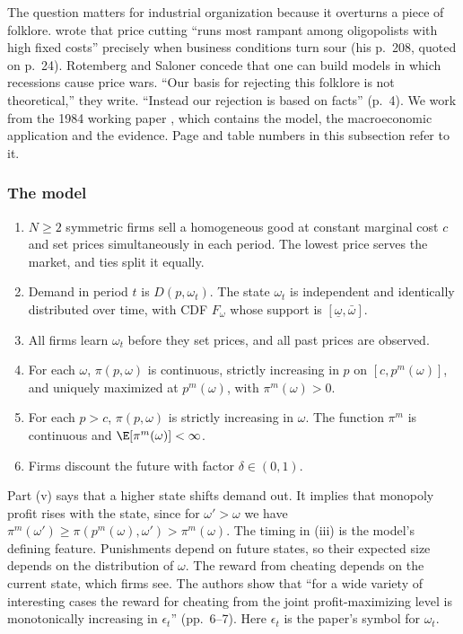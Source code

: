 The question matters for industrial organization because it overturns a piece of folklore. \citet{Scherer1980}
wrote that price cutting ``runs most rampant among oligopolists with high fixed costs'' precisely when business
conditions turn sour (his p.~208, quoted on p.~24). Rotemberg and Saloner concede that one can build models in which recessions
cause price wars. ``Our basis for rejecting this folklore is not theoretical,'' they write. ``Instead our rejection is
based on facts'' (p.~4). We work from the 1984 working paper \citep{RotembergSaloner1984}, which contains the model,
the macroeconomic application and the evidence. Page and table numbers in this subsection refer to it.

\subsubsection{The model}

\begin{assumption}\label{asm:12-rs}
\leavevmode
\begin{enumerate}[label=(\roman*)]
\item $N \ge 2$ symmetric firms sell a homogeneous good at constant marginal cost $c$ and set prices simultaneously in
each period. The lowest price serves the market, and ties split it equally.
\item Demand in period $t$ is $D(p, \omega_t)$. The state $\omega_t$ is independent and identically distributed over
time, with CDF $F_\omega$ whose support is $[\underline\omega, \bar\omega]$.
\item All firms learn $\omega_t$ before they set prices, and all past prices are observed.
\item For each $\omega$, $\pi(p,\omega)$ is continuous, strictly increasing in $p$ on $[c, p^m(\omega)]$, and uniquely
maximized at $p^m(\omega)$, with $\pi^m(\omega) > 0$.
\item For each $p > c$, $\pi(p,\omega)$ is strictly increasing in $\omega$. The function $\pi^m$ is continuous and
$\E[\pi^m(\omega)] < \infty$.
\item Firms discount the future with factor $\delta \in (0,1)$.
\end{enumerate}
\end{assumption}

Part (v) says that a higher state shifts demand out. It implies that monopoly profit rises with the state, since for
$\omega' > \omega$ we have $\pi^m(\omega') \ge \pi(p^m(\omega), \omega') > \pi^m(\omega)$. The timing in (iii) is the
model's defining feature. Punishments depend on future states, so their expected size depends on the distribution of
$\omega$. The reward from cheating depends on the current state, which firms see. The authors show that ``for a wide
variety of interesting cases the reward for cheating from the joint profit-maximizing level is monotonically
increasing in $\epsilon_t$'' (pp.~6--7). Here $\epsilon_t$ is the paper's symbol for $\omega_t$.

